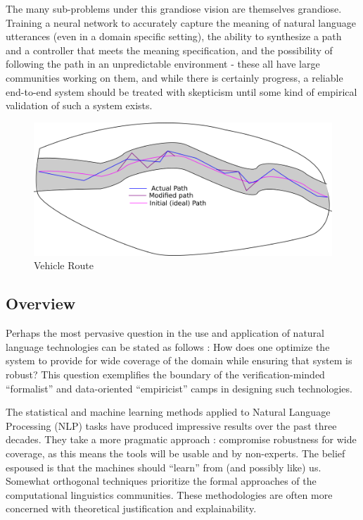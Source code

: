 \documentclass{article}
\begin{document}
The many sub-problems under this grandiose vision are themselves grandiose.
Training a neural network to accurately capture the meaning of natural language
utterances (even in a domain specific setting), the ability to synthesize a path
and a controller that meets the meaning specification, and the possibility of
following the path in an unpredictable environment - these all have large
communities working on them, and while there is certainly progress, a reliable
end-to-end system should be treated with skepticism until some kind of empirical
validation of such a system exists.

\begin{figure}
\centering
\includegraphics[width=150mm]{pics/diagramTrial1.png}
\caption{Vehicle Route}\label{fig:A2}
\end{figure}

\subsection{Overview}

Perhaps the most pervasive question in the use and application of natural
language technologies can be stated as follows : How does one optimize the
system to provide for wide coverage of the domain while ensuring that system is
robust? This question exemplifies the boundary of the verification-minded
``formalist'' and data-oriented ``empiricist'' camps in designing such
technologies.

The statistical and machine learning methods applied to Natural Language
Processing (NLP) tasks have produced impressive results over the past three decades.
They take a more pragmatic approach : compromise robustness for wide coverage,
as this means the tools will be usable and by non-experts. The belief espoused
is that the machines should ``learn'' from (and possibly like) us. Somewhat orthogonal techniques
prioritize the formal approaches of the computational linguistics communities.
These methodologies are often more concerned with theoretical justification and
explainability.
\end{document}
